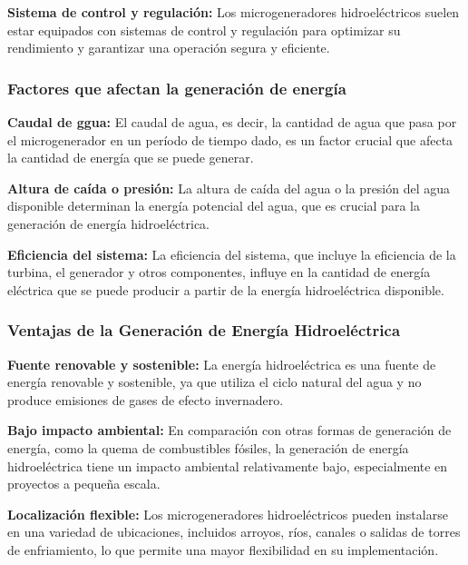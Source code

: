 \documentclass[11pt]{article}
\begin{document}
            \textbf{Sistema de control y regulación:} Los microgeneradores hidroeléctricos suelen estar
            equipados con sistemas de control y regulación para optimizar su rendimiento y garantizar
            una operación segura y eficiente.

            \subsubsection{ Factores que afectan la generación de energía}

            \textbf{Caudal de ggua:} El caudal de agua, es decir, la cantidad de agua que pasa por el
            microgenerador en un período de tiempo dado, es un factor crucial que afecta la cantidad de
            energía que se puede generar.

            \textbf{Altura de caída o presión:} La altura de caída del agua o la presión del agua disponible
            determinan la energía potencial del agua, que es crucial para la generación de energía
            hidroeléctrica.

            \textbf{Eficiencia del sistema:} La eficiencia del sistema, que incluye la eficiencia de la turbina, el
            generador y otros componentes, influye en la cantidad de energía eléctrica que se puede
            producir a partir de la energía hidroeléctrica disponible.

            
            \subsubsection{Ventajas de la Generación de Energía Hidroeléctrica}

            \textbf{Fuente renovable y sostenible:} La energía hidroeléctrica es una fuente de energía
            renovable y sostenible, ya que utiliza el ciclo natural del agua y no produce emisiones de
            gases de efecto invernadero.

            \textbf{Bajo impacto ambiental:} En comparación con otras formas de generación de energía, como
            la quema de combustibles fósiles, la generación de energía hidroeléctrica tiene un impacto
            ambiental relativamente bajo, especialmente en proyectos a pequeña escala.
            
            \textbf{Localización flexible:} Los microgeneradores hidroeléctricos pueden instalarse en una
            variedad de ubicaciones, incluidos arroyos, ríos, canales o salidas de torres de enfriamiento,
            lo que permite una mayor flexibilidad en su implementación.
            
\end{document}
